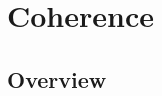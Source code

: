 \renewcommand{\lastmod}{September 18, 2023}
\renewcommand{\chapterauthors}{Markus Lippitz}

\chapter{Coherence}

\section{Overview}



\printbibliography[segment=\therefsegment,heading=subbibliography]
